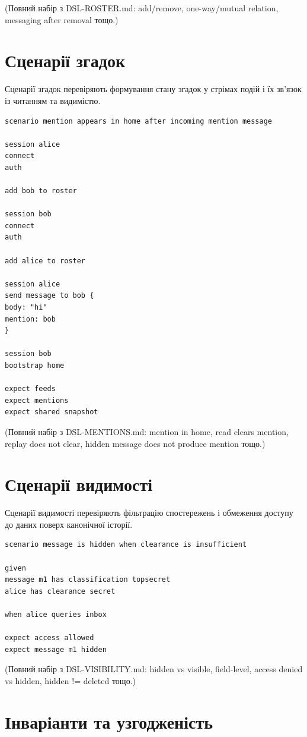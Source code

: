 \documentclass{article}
\begin{document}
(Повний набір з DSL-ROSTER.md: add/remove, one-way/mutual relation, messaging after removal тощо.)

\section{Сценарії згадок}

Сценарії згадок перевіряють формування стану згадок у стрімах подій і їх зв’язок із читанням та видимістю.

\begin{lstlisting}[language={},basicstyle=\ttfamily\small]
scenario mention appears in home after incoming mention message

session alice
connect
auth

add bob to roster

session bob
connect
auth

add alice to roster

session alice
send message to bob {
body: "hi"
mention: bob
}

session bob
bootstrap home

expect feeds
expect mentions
expect shared snapshot
\end{lstlisting}

(Повний набір з DSL-MENTIONS.md: mention in home, read clears mention, replay does not clear, hidden message does not produce mention тощо.)

\section{Сценарії видимості}

Сценарії видимості перевіряють фільтрацію спостережень і обмеження доступу до даних поверх канонічної історії.

\begin{lstlisting}[language={},basicstyle=\ttfamily\small]
scenario message is hidden when clearance is insufficient

given
message m1 has classification topsecret
alice has clearance secret

when alice queries inbox

expect access allowed
expect message m1 hidden
\end{lstlisting}

(Повний набір з DSL-VISIBILITY.md: hidden vs visible, field-level, access denied vs hidden, hidden != deleted тощо.)

\section{Інваріанти та узгодженість}
\end{document}
